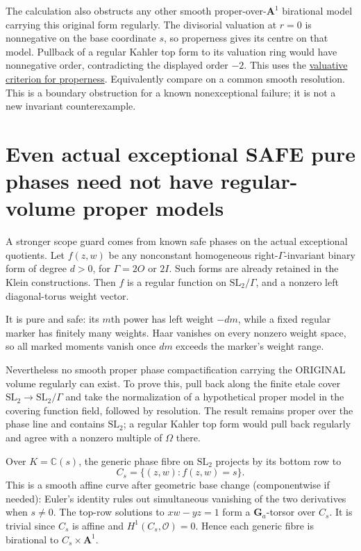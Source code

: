 \documentclass{article}
\begin{document}
The calculation also obstructs any other smooth proper-over-$\mathbf A^1$ birational model carrying this original form regularly. The divisorial valuation at $r=0$ is nonnegative on the base coordinate $s$, so properness gives its centre on that model. Pullback of a regular Kahler top form to its valuation ring would have nonnegative order, contradicting the displayed order $-2$. This uses the \href{https://stacks.math.columbia.edu/tag/0BX5}{valuative criterion for properness}. Equivalently compare on a common smooth resolution. This is a boundary obstruction for a known nonexceptional failure; it is not a new invariant counterexample.

\section{Even actual exceptional SAFE pure phases need not have regular-volume proper models}
A stronger scope guard comes from known safe phases on the actual exceptional quotients. Let $f(z,w)$ be any nonconstant homogeneous right-$\Gamma$-invariant binary form of degree $d>0$, for $\Gamma=2O$ or $2I$. Such forms are already retained in the Klein constructions. Then $f$ is a regular function on $\mathrm{SL}_2/\Gamma$, and a nonzero left diagonal-torus weight vector.

It is pure and safe: its $m$th power has left weight $-dm$, while a fixed regular marker has finitely many weights. Haar vanishes on every nonzero weight space, so all marked moments vanish once $dm$ exceeds the marker's weight range.

Nevertheless no smooth proper phase compactification carrying the ORIGINAL volume regularly can exist. To prove this, pull back along the finite etale cover $\mathrm{SL}_2\to\mathrm{SL}_2/\Gamma$ and take the normalization of a hypothetical proper model in the covering function field, followed by resolution. The result remains proper over the phase line and contains $\mathrm{SL}_2$; a regular Kahler top form would pull back regularly and agree with a nonzero multiple of $\Omega$ there.

Over $K=\mathbb C(s)$, the generic phase fibre on $\mathrm{SL}_2$ projects by its bottom row to
\[
 C_s=\{(z,w): f(z,w)=s\}.
\]
This is a smooth affine curve after geometric base change (componentwise if needed): Euler's identity rules out simultaneous vanishing of the two derivatives when $s\ne0$. The top-row solutions to $xw-yz=1$ form a $\mathbf G_a$-torsor over $C_s$. It is trivial since $C_s$ is affine and $H^1(C_s,\mathcal O)=0$. Hence each generic fibre is birational to $C_s\times\mathbf A^1$.
\end{document}
